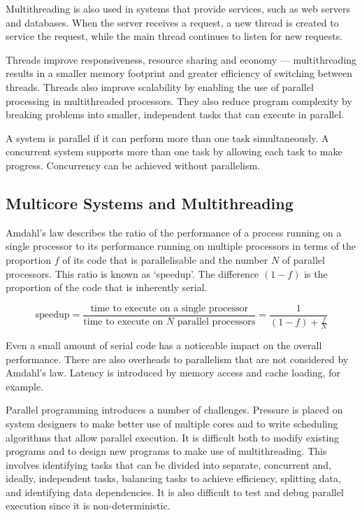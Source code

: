 Multithreading is also used in systems that provide services, such as web servers and databases.
When the server receives a request, a new thread is created to service the request, while the main thread continues to listen for new requests.

Threads improve responsiveness, resource sharing and economy --- multithreading results in a smaller memory footprint and greater efficiency of switching between threads.
Threads also improve scalability by enabling the use of parallel processing in multithreaded processors.
They also reduce program complexity by breaking problems into smaller, independent tasks that can execute in parallel.

A system is parallel if it can perform more than one task simultaneously.
A concurrent system supports more than one task by allowing each task to make progress.
Concurrency can be achieved without parallelism.

\subsection{Multicore Systems and Multithreading}

Amdahl's law describes the ratio of the performance of a process running on a single processor to its performance running on multiple processors in terms of the proportion \(f\) of its code that is parallelisable and the number \(N\) of parallel processors.
This ratio is known as `speedup'.
The difference \(\left(1 - f\right)\) is the proportion of the code that is inherently serial.

\begin{equation*}
  \text{speedup} = \frac{\text{time to execute on a single processor}}{\text{time to execute on \(N\) parallel processors}} = \frac{1}{\left(1 - f\right) + \frac{f}{N}}
\end{equation*}

Even a small amount of serial code has a noticeable impact on the overall performance.
There are also overheads to parallelism that are not considered by Amdahl's law.
Latency is introduced by memory access and cache loading, for example.

Parallel programming introduces a number of challenges.
Pressure is placed on system designers to make better use of multiple cores and to write scheduling algorithms that allow parallel execution.
It is difficult both to modify existing programs and to design new programs to make use of multithreading.
This involves identifying tasks that can be divided into separate, concurrent and, ideally, independent tasks, balancing tasks to achieve efficiency, splitting data, and identifying data dependencies.
It is also difficult to test and debug parallel execution since it is non-deterministic.

